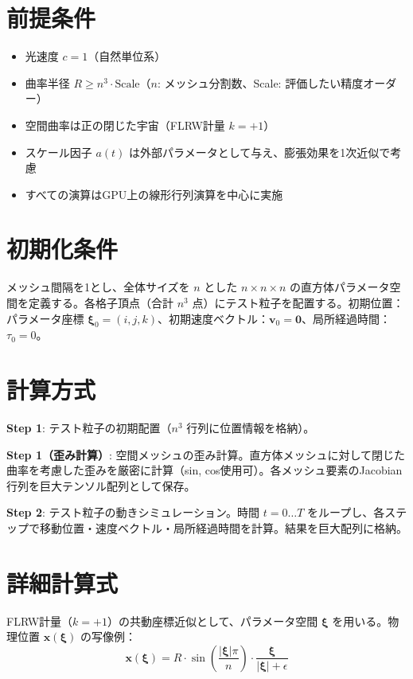 \documentclass[11pt]{ltjsarticle}
\begin{document}
\section{前提条件}
\begin{itemize}
\item 光速度 \( c = 1 \)（自然単位系）
\item 曲率半径 \( R \geq n^3 \cdot \text{Scale} \)（\( n \): メッシュ分割数、Scale: 評価したい精度オーダー）
\item 空間曲率は正の閉じた宇宙（FLRW計量 \( k = +1 \)）
\item スケール因子 \( a(t) \) は外部パラメータとして与え、膨張効果を1次近似で考慮
\item すべての演算はGPU上の線形行列演算を中心に実施
\end{itemize}

\section{初期化条件}
メッシュ間隔を1とし、全体サイズを \( n \) とした \( n \times n \times n \) の直方体パラメータ空間を定義する。各格子頂点（合計 \( n^3 \) 点）にテスト粒子を配置する。初期位置：パラメータ座標 \( \mathbf{\xi}_0 = (i, j, k) \)、初期速度ベクトル：\( \mathbf{v}_0 = \mathbf{0} \)、局所経過時間：\( \tau_0 = 0 \)。

\section{計算方式}
\textbf{Step 1}: テスト粒子の初期配置（\( n^3 \) 行列に位置情報を格納）。

\textbf{Step 1（歪み計算）}: 空間メッシュの歪み計算。直方体メッシュに対して閉じた曲率を考慮した歪みを厳密に計算（sin, cos使用可）。各メッシュ要素のJacobian行列を巨大テンソル配列として保存。

\textbf{Step 2}: テスト粒子の動きシミュレーション。時間 \( t = 0 \dots T \) をループし、各ステップで移動位置・速度ベクトル・局所経過時間を計算。結果を巨大配列に格納。

\section{詳細計算式}
FLRW計量（\( k = +1 \)）の共動座標近似として、パラメータ空間 \( \mathbf{\xi} \) を用いる。物理位置 \( \mathbf{x}(\mathbf{\xi}) \) の写像例：
\[
\mathbf{x}(\mathbf{\xi}) = R \cdot \sin\left(\frac{|\mathbf{\xi}| \pi}{n}\right) \cdot \frac{\mathbf{\xi}}{|\mathbf{\xi}| + \epsilon}
\]
\end{document}
